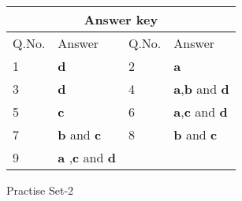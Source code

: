 \begin{enumerate}[label=\color{ocre}\textbf{\arabic*.}]
\setlength\arrayrulewidth{1pt}
\begin{table}[H]
	\centering
	\begin{tabular}{|p{1.5cm}|p{1.5cm}||p{1.5cm}|p{1.5cm}|}
		\hline
		\multicolumn{4}{|c|}{\textbf{Answer key}}\\\hline\hline
		\rowcolor{ocrel}Q.No.&Answer&Q.No.&Answer\\\hline
		1&\textbf{d} &2&\textbf{a}\\\hline 
		3&\textbf{d} &4&\textbf{a},\textbf{b} and \textbf{d} \\\hline
		5&\textbf{c} &6&\textbf{a},\textbf{c} and \textbf{d}\\\hline
		7&\textbf{b} and \textbf{c}&8&\textbf{b} and \textbf{c}\\\hline
		9&\textbf{a} ,\textbf{c} and \textbf{d}& & \\\hline
		\end{tabular}
\end{table}
\end{enumerate}
\newpage 
\begin{abox}
Practise Set-2
\end{abox}

